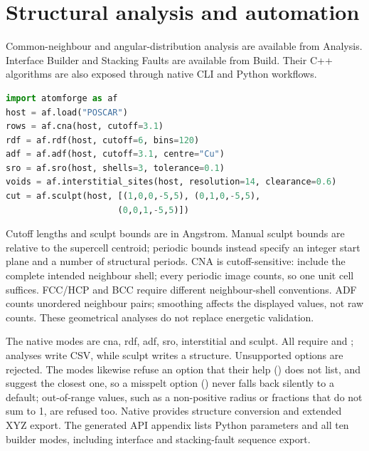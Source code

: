 \section{Structural analysis and automation}
Common-neighbour and angular-distribution analysis are available from Analysis. Interface Builder and Stacking Faults are available from Build. Their C++ algorithms are also exposed through native CLI and Python workflows.
\begin{lstlisting}[language=Python]
import atomforge as af
host = af.load("POSCAR")
rows = af.cna(host, cutoff=3.1)
rdf = af.rdf(host, cutoff=6, bins=120)
adf = af.adf(host, cutoff=3.1, centre="Cu")
sro = af.sro(host, shells=3, tolerance=0.1)
voids = af.interstitial_sites(host, resolution=14, clearance=0.6)
cut = af.sculpt(host, [(1,0,0,-5,5), (0,1,0,-5,5),
                      (0,0,1,-5,5)])
\end{lstlisting}
Cutoff lengths and sculpt bounds are in Angstrom. Manual sculpt bounds are relative to the supercell centroid; periodic bounds instead specify an integer start plane and a number of structural periods. CNA is cutoff-sensitive: include the complete intended neighbour shell; every periodic image counts, so one unit cell suffices. FCC/HCP and BCC require different neighbour-shell conventions. ADF counts unordered neighbour pairs; smoothing affects the displayed values, not raw counts. These geometrical analyses do not replace energetic validation.

The native  modes are cna, rdf, adf, sro, interstitial and sculpt. All require  and ; analyses write CSV, while sculpt writes a structure. Unsupported options are rejected. The  modes likewise refuse an option that their help () does not list, and suggest the closest one, so a misspelt option () never falls back silently to a default; out-of-range values, such as a non-positive radius or  fractions that do not sum to 1, are refused too. Native  provides structure conversion and extended XYZ export. The generated API appendix lists Python parameters and all ten builder modes, including interface and stacking-fault sequence export.

